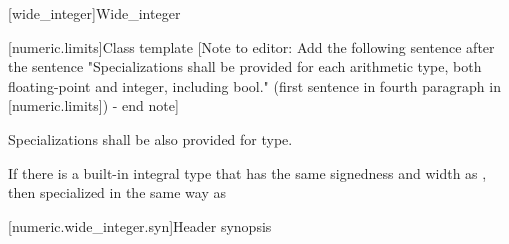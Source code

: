
[wide_integer]{Wide_integer}


%
[numeric.limits]{Class template }
[Note to editor: Add the following sentence after the sentence "Specializations shall be provided for each arithmetic type, both floating-point and integer, including bool." (first sentence in fourth paragraph in [numeric.limits]) - end note]

Specializations shall be also provided for  type.

\begin{note}
If there is a built-in integral type  that has the same signedness and width as , then  specialized in the same way as 
\end{note}

[numeric.wide_integer.syn]{Header  synopsis}

